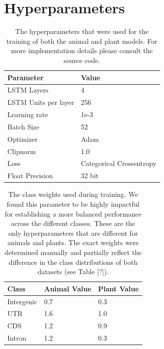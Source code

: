 \documentclass{article}
\renewcommand{\thetable}{S\arabic{table}}
\begin{document}
\section{Hyperparameters}
\label{sec:hyperparameters}
\begin{table}[!h]
\centering
\begin{tabular}{@{}ll@{}}
\hline
Parameter & Value \\ [0.5ex]
\hline
LSTM Layers & 4 \\
LSTM Units per layer & 256 \\
Learning rate & 1e-3 \\
Batch Size & 52 \\
Optimizer & Adam \\
Clipnorm & 1.0 \\
Loss & Categorical Crossentropy \\
Float Precision & 32 bit \\
\hline
\end{tabular}
\caption{The hyperparameters that were used for the training of both the animal and plant models. For more implementation details please consult the source code.}
\label{suptab:params}
\end{table}

\begin{table}[!h]
\centering
\begin{tabular}{@{}lll@{}}
\hline
Class & Animal Value & Plant Value \\ [0.5ex]
\hline
Intergenic & 0.7 & 0.3 \\
UTR & 1.6 & 1.0 \\
CDS & 1.2 & 0.9 \\
Intron & 1.2 & 0.3 \\
\hline
\end{tabular}
\caption{The class weights used during training. We found this parameter to be highly impactful for establishing a more balanced performance across the different classes. These are the only hyperparameters that are different for animals and plants. The exact weights were determined manually and partially reflect the difference in the class distributions of both datasets (see Table [?]).}
\label{suptab:classweights}
\end{table}
\newpage
\end{document}
